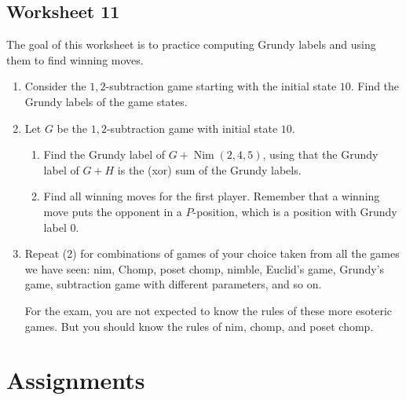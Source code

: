 \documentclass{amsart}
\begin{document}
\subsection{Worksheet 11}
\label{sec:org51aaac9}
\toggletrue{solutions}

The goal of this worksheet is to practice computing Grundy labels and using them to find winning moves.

\begin{enumerate}
\item Consider the \(1,2\)-subtraction game starting with the initial state \(10\).
Find the Grundy labels of the game states.

\item Let \(G\) be the \(1,2\)-subtraction game with initial state \(10\).
\begin{enumerate}
\item Find the Grundy label of \(G + \operatorname{Nim}(2,4,5)\), using that the Grundy label of \(G+H\) is the (xor) sum of the Grundy labels.

\item Find all winning moves for the first player.  Remember that a winning move puts the opponent in a \(P\)-position, which is a position with Grundy label \(0\).
\end{enumerate}

\item Repeat (2) for combinations of games of your choice taken from all the games we have seen: nim, Chomp, poset chomp, nimble, Euclid's game, Grundy's game, subtraction game with different parameters, and so on.

For the exam, you are not expected to know the rules of these more esoteric games.
But you should know the rules of nim, chomp, and poset chomp.
\end{enumerate}
\section{Assignments}
\label{sec:orgfbfcb6a}
\end{document}
